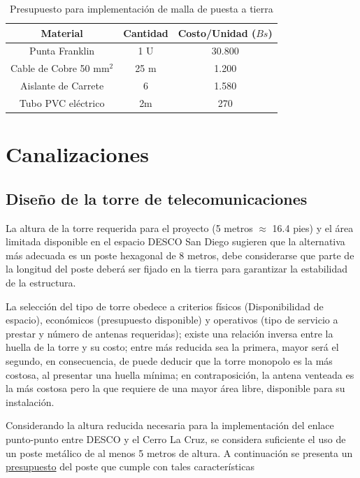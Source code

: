 \documentclass[11pt, a4paper, twosides]{report}
\begin{document}
\begin{table}[h]
    \centering
    \begin{tabular}{|c|c|c|}
        \hline
        \cellcolor{gray75} \textbf{Material} & \cellcolor{gray75} \textbf{Cantidad} & \cellcolor{gray75} \textbf{Costo/Unidad ($ Bs $)} \\ \hline
        Punta Franklin & 1 U & 30.800 \\ \hline
        Cable de Cobre 50 mm$^{2}$  & 25 m & 1.200 \\ \hline
        Aislante de Carrete & 6 & 1.580 \\ \hline
        Tubo PVC eléctrico & 2m & 270 \\ \hline
    \end{tabular}
    \caption{Presupuesto para implementación de malla de puesta a tierra}
\end{table}

\chapter{Canalizaciones}
\section{Diseño de la torre de telecomunicaciones}
La altura de la torre requerida para el proyecto (5 metros $\approx$ 16.4 pies) y el área limitada disponible en el espacio DESCO San Diego sugieren que la alternativa más adecuada es un poste hexagonal de 8 metros, debe considerarse que parte de la longitud del poste deberá ser fijado en la tierra para garantizar la estabilidad de la estructura.

La selección del tipo de torre obedece a criterios físicos (Disponibilidad de espacio), económicos (presupuesto disponible) y operativos (tipo de servicio a prestar y número de antenas requeridas)\cite{freeman2006radio}; existe una relación inversa entre la huella de la torre y su costo; entre más reducida sea la primera, mayor será el segundo, en consecuencia, de puede deducir que la torre monopolo es la más costosa, al presentar una huella mínima; en contraposición, la antena venteada es la más costosa pero la que  requiere de una mayor área libre, disponible para su instalación. 

Considerando la altura reducida necesaria para la implementación del enlace punto-punto entre DESCO y el Cerro La Cruz, se considera suficiente el uso de un poste metálico de al menos 5 metros de altura. A continuación se presenta un \href{http://articulo.mercadolibre.com.ve/MLV-462232615-postes-hexagonal-600-m-_JM}{presupuesto} del poste que cumple con tales características
\end{document}
